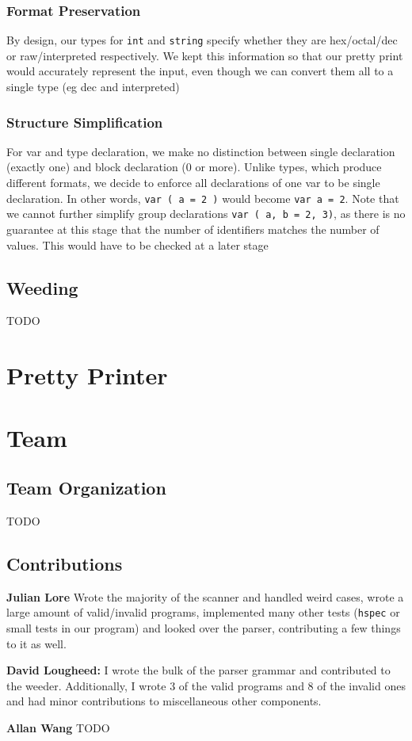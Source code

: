 \documentclass[11pt]{article}
\begin{document}
\subsubsection{Format Preservation}
\label{sec:org860873e}
By design, our types for \texttt{int} and \texttt{string} specify whether they
are hex/octal/dec or raw/interpreted respectively. We kept this
information so that our pretty print would accurately represent
the input, even though we can convert them all to a single type
(eg dec and interpreted)
\subsubsection{Structure Simplification}
\label{sec:org99a1336}
For var and type declaration, we make no distinction between
single declaration (exactly one) and block declaration (0 or
more). Unlike types, which produce different formats, we decide to
enforce all declarations of one var to be single declaration. In
other words, \texttt{var ( a = 2 )} would become \texttt{var a = 2}. Note that
we cannot further simplify group declarations \texttt{var ( a, b = 2,
    3)}, as there is no guarantee at this stage that the number of
identifiers matches the number of values. This would have to be
checked at a later stage
\subsection{Weeding}
\label{sec:org411e06f}
TODO
\section{Pretty Printer}
\label{sec:orgea0d612}
\section{Team}
\label{sec:org16693aa}
\subsection{Team Organization}
\label{sec:org8a62e4b}
TODO
\subsection{Contributions}
\label{sec:org4adb7eb}
\textbf{Julian Lore} Wrote the majority of the scanner and handled weird
cases, wrote a large amount of valid/invalid programs, implemented
many other tests (\texttt{hspec} or small tests in our program) and looked
over the parser, contributing a few things to it as well.

\textbf{David Lougheed:} I wrote the bulk of the parser grammar and contributed to
the weeder. Additionally, I wrote 3 of the valid programs and 8 of the
invalid ones and had minor contributions to miscellaneous other components.

\textbf{Allan Wang} TODO
\end{document}
